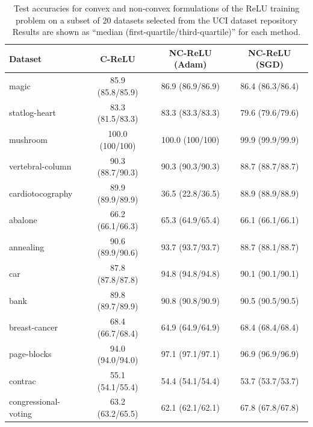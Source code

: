 \begin{table}
    \centering
    \caption{Test accuracies for convex and non-convex formulations of the ReLU training problem on a subset of 20 datasets selected from the UCI dataset repository
        Results are shown as ``median (first-quartile/third-quartile)'' for each method.}%
    \label{table:uci-relu-accuracies}
    \vspace{0.1in}
    \begin{small}
        \begin{tabular}{lccc} \toprule
            \textbf{Dataset}     & \textbf{C-ReLU}  & \textbf{NC-ReLU (Adam)} & \textbf{NC-ReLU (SGD)} \\ \midrule
            magic                & 85.9 (85.8/85.9) & 86.9 (86.9/86.9)        & 86.4 (86.3/86.4)       \\
            statlog-heart        & 83.3 (81.5/83.3) & 83.3 (83.3/83.3)        & 79.6 (79.6/79.6)       \\
            mushroom             & 100.0 (100/100)  & 100.0 (100/100)         & 99.9 (99.9/99.9)       \\
            vertebral-column     & 90.3 (88.7/90.3) & 90.3 (90.3/90.3)        & 88.7 (88.7/88.7)       \\
            cardiotocography     & 89.9 (89.9/89.9) & 36.5 (22.8/36.5)        & 88.9 (88.9/88.9)       \\
            abalone              & 66.2 (66.1/66.3) & 65.3 (64.9/65.4)        & 66.1 (66.1/66.1)       \\
            annealing            & 90.6 (89.9/90.6) & 93.7 (93.7/93.7)        & 88.7 (88.1/88.7)       \\
            car                  & 87.8 (87.8/87.8) & 94.8 (94.8/94.8)        & 90.1 (90.1/90.1)       \\
            bank                 & 89.8 (89.7/89.9) & 90.8 (90.8/90.9)        & 90.5 (90.5/90.5)       \\
            breast-cancer        & 68.4 (66.7/68.4) & 64.9 (64.9/64.9)        & 68.4 (68.4/68.4)       \\
            page-blocks          & 94.0 (94.0/94.0) & 97.1 (97.1/97.1)        & 96.9 (96.9/96.9)       \\
            contrac              & 55.1 (54.1/55.4) & 54.4 (54.1/54.4)        & 53.7 (53.7/53.7)       \\
            congressional-voting & 63.2 (63.2/65.5) & 62.1 (62.1/62.1)        & 67.8 (67.8/67.8)       \\

\end{tabular}
\end{small}
\end{table}

